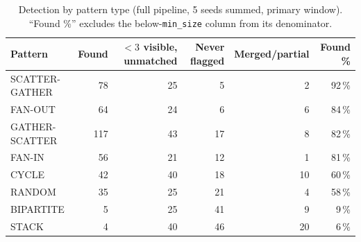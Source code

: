 \begin{table}[t]
\centering
\caption{Detection by pattern type (full pipeline, 5 seeds summed, primary window). ``Found
\%'' excludes the below-\texttt{min\_size} column from its denominator.}
\label{tab:per-pattern}
\small
\begin{tabular}{lrrrrr}
\toprule
Pattern & Found & $<3$ visible, unmatched & Never flagged & Merged/partial & Found \% \\
\midrule
SCATTER-GATHER & 78 & 25 & 5 & 2 & 92\,\% \\ %
FAN-OUT & 64 & 24 & 6 & 6 & 84\,\% \\ %
GATHER-SCATTER & 117 & 43 & 17 & 8 & 82\,\% \\ %
FAN-IN & 56 & 21 & 12 & 1 & 81\,\% \\ %
CYCLE & 42 & 40 & 18 & 10 & 60\,\% \\ %
RANDOM & 35 & 25 & 21 & 4 & 58\,\% \\ %
BIPARTITE & 5 & 25 & 41 & 9 & 9\,\% \\ %
STACK & 4 & 40 & 46 & 20 & 6\,\% \\ %
\bottomrule
\end{tabular}
\end{table}
